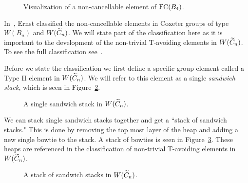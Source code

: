 \begin{figure*}[h!] \centering
{}	
\caption{Visualization of a non-cancellable element of $\mathrm{FC}(B_4)$.}\label{fig:noncancelvisual}
\end{figure*}

In~\cite{Ernst2010}, Ernst classified the non-cancellable elements in Coxeter groups of type $W(B_n)$ and $W(\widetilde{C}_n)$. We will state part of the classification here as it is important to the development of the non-trivial T-avoiding elements in $W(\widetilde{C}_n)$. To see the full classification see~\cite[Sections 4.2 and 5]{Ernst2010}. 

Before we state the classification we first define a specific group element called a Type II element in $W(\widetilde{C}_n)$. We will refer to this element as a single \emph{sandwich stack}, which is seen in Figure~\ref{fig:singsandstack}.

\begin{figure}[h!] \centering
{}
\caption{A single sandwich stack in $W(\widetilde{C}_n)$.}\label{fig:singsandstack}
\end{figure}

We can stack single sandwich stacks together and get a ``stack of sandwich stacks." This is done by removing the top most layer of the heap and adding a new single bowtie to the stack. A stack of bowties is seen in Figure~\ref{fig:stacksandstack}. These heaps are referenced in the classification of non-trivial T-avoiding elements in $W(\widetilde{C}_n)$.

\begin{figure}[h!] \centering
{}	
\caption{A stack of sandwich stacks in $W(\widetilde{C}_n)$.}\label{fig:stacksandstack}
\end{figure}

